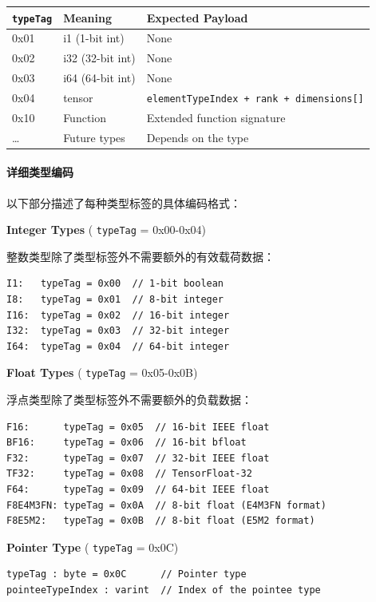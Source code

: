 \documentclass{article}
\begin{document}
\begin{longtable}{l|l|l}
\hline
\texttt{typeTag} & Meaning & Expected Payload \\ \hline
0x01 & i1 (1-bit int) & None \\ \hline
0x02 & i32 (32-bit int) & None \\ \hline
0x03 & i64 (64-bit int) & None \\ \hline
0x04 & tensor & \texttt{elementTypeIndex + rank + dimensions[]} \\ \hline
0x10 & Function & Extended function signature \\ \hline
… & Future types & Depends on the type \\ \hline
\end{longtable}


\paragraph{详细类型编码}

以下部分描述了每种类型标签的具体编码格式：


\textbf{Integer Types} ( \texttt{typeTag} = 0x00-0x04)


整数类型除了类型标签外不需要额外的有效载荷数据：


\begin{lstlisting}
I1:   typeTag = 0x00  // 1-bit boolean
I8:   typeTag = 0x01  // 8-bit integer
I16:  typeTag = 0x02  // 16-bit integer
I32:  typeTag = 0x03  // 32-bit integer
I64:  typeTag = 0x04  // 64-bit integer
\end{lstlisting}

\textbf{Float Types} ( \texttt{typeTag} = 0x05-0x0B)


浮点类型除了类型标签外不需要额外的负载数据：


\begin{lstlisting}
F16:      typeTag = 0x05  // 16-bit IEEE float
BF16:     typeTag = 0x06  // 16-bit bfloat
F32:      typeTag = 0x07  // 32-bit IEEE float
TF32:     typeTag = 0x08  // TensorFloat-32
F64:      typeTag = 0x09  // 64-bit IEEE float
F8E4M3FN: typeTag = 0x0A  // 8-bit float (E4M3FN format)
F8E5M2:   typeTag = 0x0B  // 8-bit float (E5M2 format)
\end{lstlisting}

\textbf{Pointer Type} ( \texttt{typeTag} = 0x0C)


\begin{lstlisting}
typeTag : byte = 0x0C      // Pointer type
pointeeTypeIndex : varint  // Index of the pointee type
\end{lstlisting}
\end{document}
